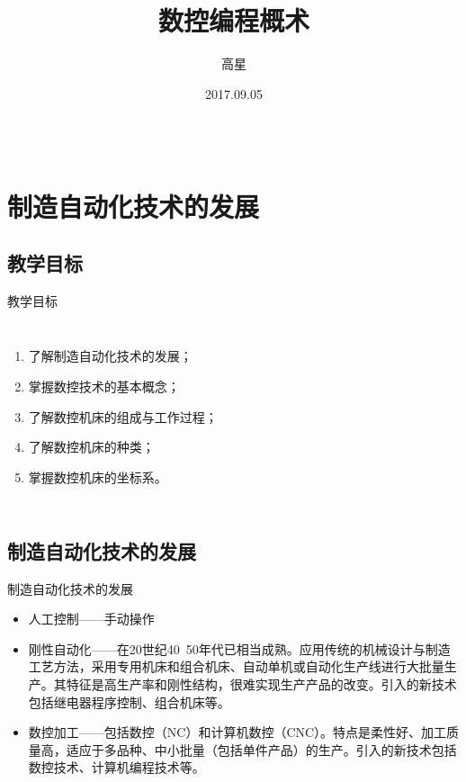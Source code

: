 \documentclass[UTF8,zihao=-4]{ctexbeamer}
\title{数控编程概术}
\author{高星}
\institute{湖南潇湘技师学院~湖南九嶷职院}
\date{2017.09.05}
\begin{document}
\begin{frame}[plain]
		\maketitle
\end{frame}

\begin{frame}
\begin{columns}
\tableofcontents[hideallsubsections]
\end{columns}
\end{frame}

\section{制造自动化技术的发展}
\subsection{教学目标}
\begin{frame}{教学目标}
\begin{columns}
	\begin{enumerate}
	\item 了解制造自动化技术的发展；
	\item 掌握数控技术的基本概念；
	\item 了解数控机床的组成与工作过程；
	\item 了解数控机床的种类；
	\item 掌握数控机床的坐标系。
\end{enumerate}
\end{columns}
\end{frame}

\subsection{制造自动化技术的发展}
\begin{frame}[<+->]{制造自动化技术的发展}
	\begin{itemize}
		\item 人工控制——手动操作
		\item 刚性自动化——在20世纪40~50年代已相当成熟。应用传统的机械设计与制造工艺方法，采用专用机床和组合机床、自动单机或自动化生产线进行大批量生产。其特征是高生产率和刚性结构，很难实现生产产品的改变。引入的新技术包括继电器程序控制、组合机床等。 
		\item 数控加工——包括数控（NC）和计算机数控（CNC）。特点是柔性好、加工质量高，适应于多品种、中小批量（包括单件产品）的生产。引入的新技术包括数控技术、计算机编程技术等。
	\end{itemize}
\end{frame}
\end{document}

